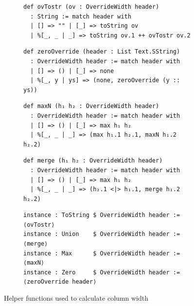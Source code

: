 \documentclass[a4paper, 11pt]{article}
\theoremstyle{remark}\newtheorem*{remark}{Remark}
\theoremstyle{definition}\newtheorem*{definition}{Definition}
\begin{document}
\begin{figure}
\centering
\begin{subfigure}{0.55\textwidth}\centering
\begin{verbatim}
def ovTostr (ov : OverrideWidth header)
  : String := match header with
  | [] => "" | [_] => toString ov
  | %[_, _ | _] => toString ov.1 ++ ovTostr ov.2
\end{verbatim}
\end{subfigure}%
\begin{subfigure}{0.55\textwidth}\centering
\begin{verbatim}
def zeroOverride (header : List Text.SString)
  : OverrideWidth header := match header with
  | [] => () | [_] => none
  | %[_, y | ys] => (none, zeroOverride (y :: ys))
\end{verbatim}
\end{subfigure}\vspace{1em}
\begin{subfigure}{0.55\textwidth}\centering
\begin{verbatim}
def maxN (h₁ h₂ : OverrideWidth header)
  : OverrideWidth header := match header with
  | [] => () | [_] => max h₁ h₂
  | %[_, _ | _] => (max h₁.1 h₂.1, maxN h₁.2 h₂.2)
\end{verbatim}
\end{subfigure}%
\begin{subfigure}{0.55\textwidth}\centering
\begin{verbatim}
def merge (h₁ h₂ : OverrideWidth header)
  : OverrideWidth header := match header with
  | [] => () | [_] => max h₁ h₂
  | %[_, _ | _] => (h₂.1 <|> h₁.1, merge h₁.2 h₂.2)
\end{verbatim}
\end{subfigure}\vspace{1em}
\begin{subfigure}{\textwidth}\centering
\begin{verbatim}
instance : ToString $ OverrideWidth header := ⟨ovTostr⟩
instance : Union    $ OverrideWidth header := ⟨merge⟩
instance : Max      $ OverrideWidth header := ⟨maxN⟩
instance : Zero     $ OverrideWidth header := ⟨zeroOverride header⟩
\end{verbatim}
\end{subfigure}
\caption{Helper functions used to calculate column width}\label{code:pp-col}
\end{figure}

\vspace{1cm}
\end{document}
